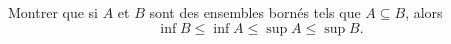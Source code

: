 

\begin{exercice}\label{exoSerieUn0012}

	Montrer que si $A$ et $B$ sont des ensembles bornés tels que $A\subseteq B$, alors
	\begin{equation}
		\inf B\leq \inf A\leq\sup A\leq\sup B.
	\end{equation}

\end{exercice}
